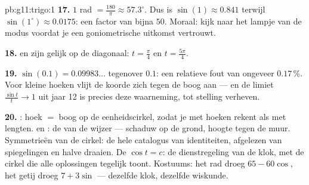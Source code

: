 \begin{solution}{pb:g11:trigo:1}
\textbf{17.} $1$ rad $= \frac{180}{\pi} \approx 57.3^\circ$. Dus is
$\sin(1) \approx 0.841$ terwijl $\sin(1^\circ) \approx 0.0175$: een factor
van bijna $50$. Moraal: kijk naar het lampje van de modus voordat je een
goniometrische uitkomst vertrouwt.

\textbf{18.}  en  zijn gelijk op de diagonaal:
$t = \frac\pi4$ en $t = \frac{5\pi}{4}$.

\textbf{19.} $\sin(0.1) = 0.09983\ldots$ tegenover $0.1$: een relatieve fout
van ongeveer $0.17\,\%$. Voor kleine hoeken vlijt de koorde zich tegen de
boog aan --- en de limiet $\frac{\sin t}{t} \to 1$ uit jaar 12 is precies
deze waarneming, tot stelling verheven.

\textbf{20.} : hoek $=$ boog op de eenheidscirkel, zodat je met
hoeken rekent als met lengten.  en : de  van de
wijzer --- schaduw op de grond, hoogte tegen de muur. Symmetrieën van de
cirkel: de hele catalogus van identiteiten, afgelezen van spiegelingen en
halve draaien. De  $\cos t = c$: de dienstregeling van de klok,
met de cirkel die alle oplossingen tegelijk toont. Kostuums: het rad droeg
$65 - 60\cos$, het getij droeg $7 + 3\sin$ --- dezelfde klok, dezelfde
wiskunde.
\end{solution}
